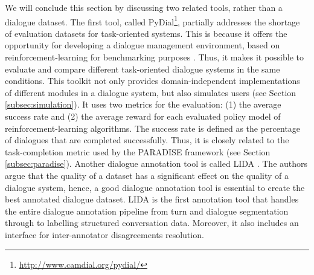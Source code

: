 We will conclude this section by discussing two related tools, rather than a dialogue dataset. The first tool, called PyDial\footnote{\url{http://www.camdial.org/pydial/}}, partially addresses the shortage of evaluation datasets for task-oriented systems. This is because it offers the opportunity for developing a dialogue management environment, based on reinforcement-learning for benchmarking purposes . Thus, it makes it possible to evaluate and compare different task-oriented dialogue systems in the same conditions. This toolkit not only provides domain-independent implementations of different modules in a dialogue system, but also simulates users (see Section \ref{subsec:simulation}). It uses two metrics for the evaluation: (1) the average success rate and (2) the average reward for each evaluated policy model of reinforcement-learning algorithms. The success rate is defined as the percentage of dialogues that are completed successfully. Thus, it is closely related to the task-completion metric used by the PARADISE framework (see Section \ref{subsec:paradise}).
Another dialogue annotation tool is called LIDA . The authors argue that the quality of a dataset has a significant effect on the quality of a dialogue system, hence, a good dialogue annotation tool is essential to create the best annotated dialogue dataset. LIDA is the first annotation tool that handles the entire dialogue annotation pipeline from turn and dialogue segmentation through to labelling structured conversation data. Moreover, it also includes an interface for inter-annotator disagreements resolution.

